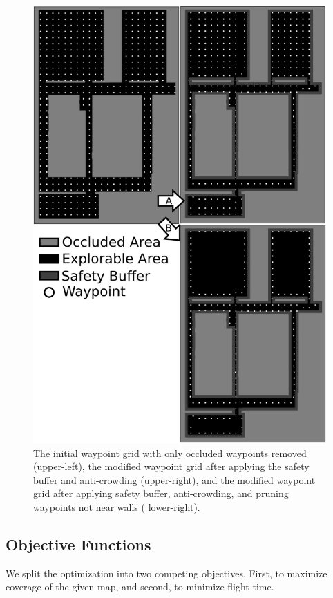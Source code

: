 \documentclass[letterpaper, 10 pt, conference]{ieeeconf}  %
\begin{document}
\begin{figure}
\centering
\includegraphics[width=1.0\linewidth]{figures/waypoint3.png}
\caption{The initial waypoint grid with only occluded waypoints removed (upper-left), the modified waypoint grid after applying the safety buffer and anti-crowding (upper-right), and the modified waypoint grid after applying safety buffer, anti-crowding, and pruning waypoints not near walls ( lower-right).}
\label{fig:waypoints}
\end{figure}

\subsection{Objective Functions}

We split the optimization into two competing objectives. First, to maximize coverage of the given map, and second, to minimize flight time.
\end{document}
